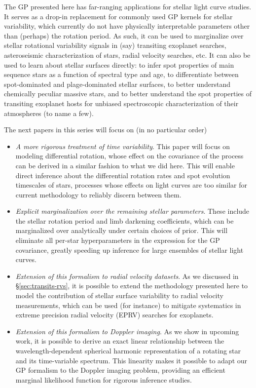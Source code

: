 \documentclass[modern]{aastex62}
\begin{document}
The GP presented here has far-ranging applications for stellar light
curve studies. It serves as a drop-in replacement for commonly used
GP kernels for stellar variability, which currently do not have
physically interpretable parameters other than (perhaps) the rotation
period. As such, it can be used to marginalize over stellar rotational variability
signals in (say) transiting exoplanet searches, asteroseismic characterization
of stars, radial velocity searches, etc. It can also be used to learn
about stellar surfaces directly: to infer spot properties of main sequence
stars as a function of spectral type and age, to differentiate between
spot-dominated and plage-dominated stellar surfaces, to better understand
chemically peculiar massive stars, and to better understand the spot
properties of transiting exoplanet hosts for unbiased spectroscopic
characterization of their atmospheres (to name a few).

The next papers in this series will focus on (in no particular order)
\begin{itemize}
    \item \emph{A more rigorous treatment of time variability}.
          This paper will focus
          on modeling differential rotation, whose effect on the covariance of the
          process can be derived in a similar fashion to what we did here. This
          will enable direct inference about the differential rotation rates and
          spot evolution timescales of stars, processes whose effects on light curves
          are too similar for current methodology to reliably discern between them.
    \item \emph{Explicit marginalization over the remaining stellar parameters}.
          These include the stellar rotation period
          and limb darkening coefficients, which can be marginalized over analytically
          under certain choices of prior. This will eliminate all per-star
          hyperparameters in the expression for the GP covariance, greatly
          speeding up inference for large ensembles of stellar light curves.
    \item \emph{Extension of this formalism to radial velocity datasets}.
          As we discussed in \S\ref{sec:transits-rvs}, it is possible to extend
          the methodology presented here to model the contribution of stellar
          surface variability to radial velocity measurements, which can be used
          (for instance) to mitigate systematics in extreme precision radial velocity
          (EPRV) searches for exoplanets.
    \item \emph{Extension of this formalism to Doppler imaging}.
          As we show in upcoming work, it is possible to derive an exact
          linear relationship between the wavelength-dependent spherical harmonic
          representation of a rotating star and its time-variable spectrum.
          This linearity makes it possible to adapt our GP formalism to the Doppler
          imaging problem, providing an efficient marginal likelihood function
          for rigorous inference studies.
\end{itemize}
\end{document}
